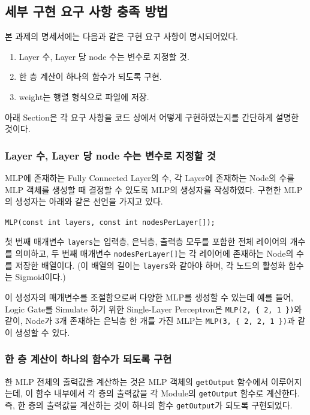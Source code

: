 \documentclass[letterpaper,10pt]{article}
\begin{document}
	\subsection{세부 구현 요구 사항 충족 방법}
	
	본 과제의 명세서에는 다음과 같은 구현 요구 사항이 명시되어있다.
	
	\begin{enumerate}
		\item Layer 수, Layer 당 node 수는 변수로 지정할 것.
		\item 한 층 계산이 하나의 함수가 되도록 구현.
		\item weight는 행렬 형식으로 파일에 저장.
	\end{enumerate}

	아래 Section은 각 요구 사항을 코드 상에서 어떻게 구현하였는지를 간단하게 설명한 것이다.
	
	\subsubsection{Layer 수, Layer 당 node 수는 변수로 지정할 것}
	
	MLP에 존재하는 Fully Connected Layer의 수, 각 Layer에 존재하는 Node의 수를 MLP 객체를 생성할 때 결정할 수 있도록 MLP의 생성자를 작성하였다. 구현한 MLP의 생성자는 아래와 같은 선언을 가지고 있다.
	
	\verb|MLP(const int layers, const int nodesPerLayer[]);|
	
	첫 번째 매개변수 \verb|layers|는 입력층, 은닉층, 출력층 모두를 포함한 전체 레이어의 개수를 의미하고, 두 번째 매개변수 \verb|nodesPerLayer[]|는 각 레이어에 존재하는 Node의 수를 저장한 배열이다. (이 배열의 길이는 \verb|layers|와 같아야 하며, 각 노드의 활성화 함수는 Sigmoid이다.)
	
	이 생성자의 매개변수를 조절함으로써 다양한 MLP를 생성할 수 있는데 예를 들어, Logic Gate를 Simulate 하기 위한 Single-Layer Perceptron은 \verb|MLP(2, { 2, 1 })|와 같이, Node가 3개 존재하는 은닉층 한 개를 가진 MLP는 \verb|MLP(3, { 2, 2, 1 })|과 같이 생성할 수 있다.
	
	\subsubsection{한 층 계산이 하나의 함수가 되도록 구현}
	
	한 MLP 전체의 출력값을 계산하는 것은 MLP 객체의 \verb|getOutput| 함수에서 이루어지는데, 이 함수 내부에서 각 층의 출력값을 각 Module의 \verb|getOutput| 함수로 계산한다. 즉, 한 층의 출력값을 계산하는 것이 하나의 함수 \verb|getOutput|가 되도록 구현되었다.
	
\end{document}
